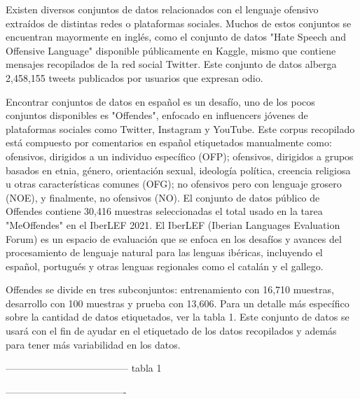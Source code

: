 Existen diversos conjuntos de datos relacionados con el lenguaje ofensivo extraídos de distintas redes o plataformas sociales. Muchos de estos conjuntos se encuentran mayormente en inglés, como el conjunto de datos "Hate Speech and Offensive Language" disponible públicamente en Kaggle, mismo que contiene mensajes recopilados de la red social Twitter. Este conjunto de datos alberga 2,458,155 tweets publicados por usuarios que expresan odio.

Encontrar conjuntos de datos en español es un desafío, uno de los pocos conjuntos disponibles es "Offendes", enfocado en influencers jóvenes de plataformas sociales como Twitter, Instagram y YouTube. Este corpus recopilado está compuesto por comentarios en español etiquetados manualmente como: ofensivos, dirigidos a un individuo específico (OFP); ofensivos, dirigidos a grupos basados en etnia, género, orientación sexual, ideología política, creencia religiosa u otras características comunes (OFG); no ofensivos pero con lenguaje grosero (NOE), y finalmente, no ofensivos (NO). El conjunto de datos público de Offendes contiene 30,416 muestras seleccionadas el total usado en la tarea "MeOffendes" en el IberLEF 2021. El IberLEF (Iberian Languages Evaluation Forum) es un espacio de evaluación que se enfoca en los desafíos y avances del procesamiento de lenguaje natural para las lenguas ibéricas, incluyendo el español, portugués y otras lenguas regionales como el catalán y el gallego.

Offendes se divide en tres subconjuntos: entrenamiento con 16,710 muestras, desarrollo con 100 muestras y prueba con 13,606. Para un detalle más específico sobre la cantidad de datos etiquetados, ver la tabla 1. Este conjunto de datos se usará con el fin de ayudar en el etiquetado de los datos recopilados y además para tener más variabilidad en los datos.


--------------------------------------
tabla 1

-------------------------------------

